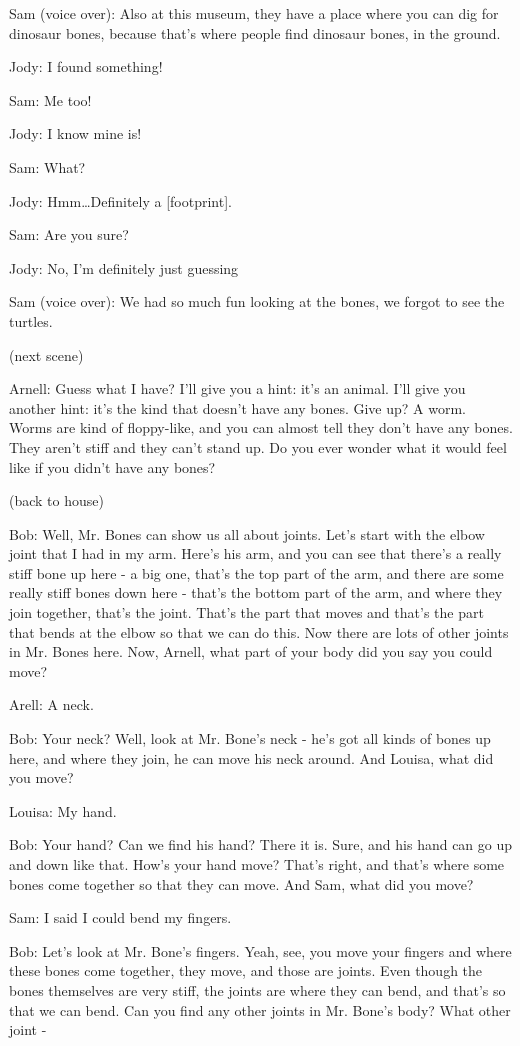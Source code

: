 Sam (voice over): Also at this museum, they have a place where you can dig for dinosaur bones, because that's where people find dinosaur bones, in the ground.

Jody: I found something!

Sam: Me too!

Jody: I know mine is!

Sam: What?

Jody: Hmm\dots Definitely a [footprint].

Sam: Are you sure?

Jody: No, I'm definitely just guessing

Sam (voice over): We had so much fun looking at the bones, we forgot to see the turtles.

(next scene)

Arnell: Guess what I have? I'll give you a hint: it's an animal. I'll give you another hint: it's the kind that doesn't have any bones. Give up? A worm. Worms are kind of floppy-like, and you can almost tell they don't have any bones. They aren't stiff and they can't stand up. Do you ever wonder what it would feel like if you didn't have any bones?

(back to house)

Bob: Well, Mr. Bones can show us all about joints. Let's start with the elbow joint that I had in my arm. Here's his arm, and you can see that there's a really stiff bone up here - a big one, that's the top part of the arm, and there are some really stiff bones down here - that's the bottom part of the arm, and where they join together, that's the joint. That's the part that moves and that's the part that bends at the elbow so that we can do this. Now there are lots of other joints in Mr. Bones here. Now, Arnell, what part of your body did you say you could move?

Arell: A neck.

Bob: Your neck? Well, look at Mr. Bone's neck - he's got all kinds of bones up here, and where they join, he can move his neck around. And Louisa, what did you move?

Louisa: My hand.

Bob: Your hand? Can we find his hand? There it is. Sure, and his hand can go up and down like that. How's your hand move? That's right, and that's where some bones come together so that they can move. And Sam, what did you move?

Sam: I said I could bend my fingers.

Bob: Let's look at Mr. Bone's fingers. Yeah, see, you move your fingers and where these bones come together, they move, and those are joints. Even though the bones themselves are very stiff, the joints are where they can bend, and that's so that we can bend. Can you find any other joints in Mr. Bone's body? What other joint -


